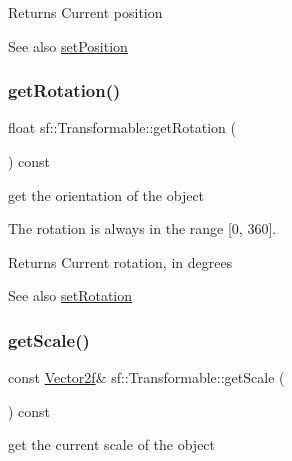 \begin{DoxyReturn}{Returns}
Current position
\end{DoxyReturn}
\begin{DoxySeeAlso}{See also}
\hyperlink{classsf_1_1_transformable_a4dbfb1a7c80688b0b4c477d706550208}{set\+Position} 
\end{DoxySeeAlso}
\mbox{\label{classsf_1_1_transformable_aa00b5c5d4a06ac24a94dd72c56931d3a}} 
\subsubsection{\texorpdfstring{get\+Rotation()}{getRotation()}}
{\footnotesize\ttfamily float sf\+::\+Transformable\+::get\+Rotation (\begin{DoxyParamCaption}{ }\end{DoxyParamCaption}) const}



get the orientation of the object 

The rotation is always in the range \mbox{[}0, 360\mbox{]}.

\begin{DoxyReturn}{Returns}
Current rotation, in degrees
\end{DoxyReturn}
\begin{DoxySeeAlso}{See also}
\hyperlink{classsf_1_1_transformable_a32baf2bf1a74699b03bf8c95030a38ed}{set\+Rotation} 
\end{DoxySeeAlso}
\mbox{\label{classsf_1_1_transformable_a73819fdea80ca8a06fad8a0067b4588c}} 
\subsubsection{\texorpdfstring{get\+Scale()}{getScale()}}
{\footnotesize\ttfamily const \hyperlink{classsf_1_1_vector2}{Vector2f}\& sf\+::\+Transformable\+::get\+Scale (\begin{DoxyParamCaption}{ }\end{DoxyParamCaption}) const}



get the current scale of the object 

